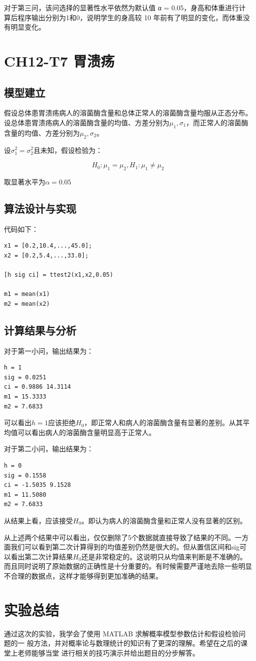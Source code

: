\documentclass{article}
\begin{document}
对于第三问，该问选择的显著性水平依然为默认值 α = 0.05，身高和体重进行计算后程序输出分别为1和0，说明学生的身高较 10 年前有了明显的变化，而体重没有明显变化。


\section{CH12-T7 胃溃疡}

\subsection{模型建立}
假设总体患胃溃疡病人的溶菌酶含量和总体正常人的溶菌酶含量均服从正态分布。设总体患胃溃疡病人的溶菌酶含量的均值、方差分别为$\mu_1,\sigma_1$，而正常人的溶菌酶含量的均值、方差分别为$\mu_2,\sigma_2$。

设$\sigma_1^2=\sigma_2^2$且未知，假设检验为：

$$H_0:\mu_1=\mu_2,H_1:\mu_1\neq\mu_2$$

取显著水平为$\alpha = 0.05$


\subsection{算法设计与实现}

代码如下：

\begin{lstlisting}
x1 = [0.2,10.4,...,45.0];
x2 = [0.2,5.4,...,33.0];

[h sig ci] = ttest2(x1,x2,0.05)

m1 = mean(x1)
m2 = mean(x2)
\end{lstlisting}

\subsection{计算结果与分析}
对于第一小问，输出结果为：
\begin{lstlisting}
h = 1
sig = 0.0251
ci = 0.9886 14.3114
m1 = 15.3333
m2 = 7.6833
\end{lstlisting}

可以看出$h=1$应该拒绝$H_0$，即正常人和病人的溶菌酶含量有显著的差别。从其平均值可以看出病人的溶菌酶含量明显高于正常人。


对于第二小问，输出结果为：
\begin{lstlisting}
h = 0
sig = 0.1558
ci = -1.5035 9.1528
m1 = 11.5080
m2 = 7.6833
\end{lstlisting}

从结果上看，应该接受$H_0$。即认为病人的溶菌酶含量和正常人没有显著的区别。

从上述两个结果中可以看出，仅仅删除了5个数据就直接导致了结果的不同。一方面我们可以看到第二次计算得到的均值差别仍然是很大的。但从置信区间和sig可以看出第二次计算结果$H_0$还是非常稳定的。这说明只从均值来判断是不准确的。而且同时说明了原始数据的正确性是十分重要的。有时候需要严谨地去除一些明显不合理的数据点，这样才能够得到更加准确的结果。

\section{实验总结}

通过这次的实验，我学会了使用 MATLAB 求解概率模型参数估计和假设检验问题的一 般方法，并对概率论与数理统计的知识有了更深的理解。希望在之后的课堂上老师能够当堂 进行相关的技巧演示并给出题目的分步解答。
\end{document}
